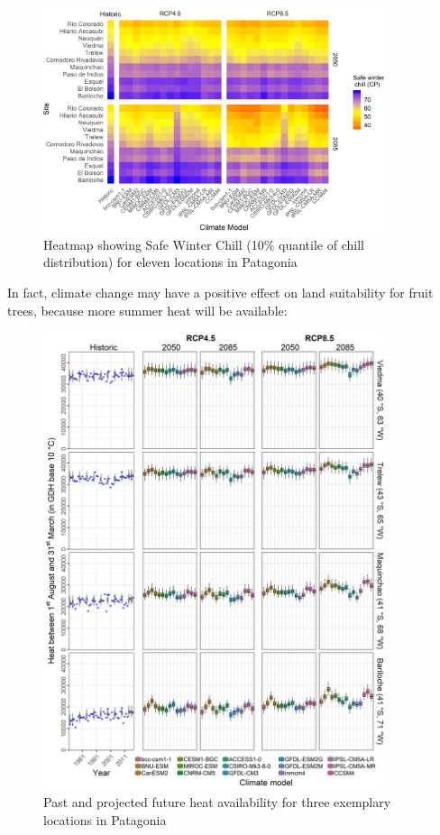 \documentclass[
]{book}
\begin{document}
\begin{figure}
\centering
\includegraphics[width=0.9\textwidth,height=\textheight]{pictures/Patagonia_heatmap.png}
\caption{Heatmap showing Safe Winter Chill (10\% quantile of chill distribution) for eleven locations in Patagonia}
\end{figure}

In fact, climate change may have a positive effect on land suitability for fruit trees, because more summer heat will be available:

\begin{figure}
\centering
\includegraphics[width=0.9\textwidth,height=\textheight]{pictures/Patagonia_heat.png}
\caption{Past and projected future heat availability for three exemplary locations in Patagonia}
\end{figure}
\end{document}
